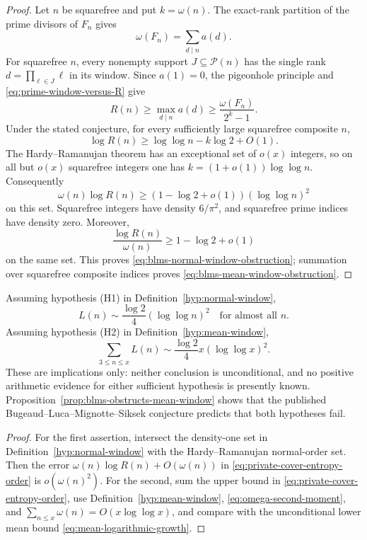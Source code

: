 \begin{proof}
Let $n$ be squarefree and put $k=\omega(n)$. The exact-rank partition of the
prime divisors of $F_n$ gives
\[
 \omega(F_n)=\sum_{d\mid n}a(d).
\]
For squarefree $n$, every nonempty support $J\subseteq\mathcal P(n)$ has the
single rank $d=\prod_{\ell\in J}\ell$ in its window. Since $a(1)=0$, the
pigeonhole principle and \eqref{eq:prime-window-versus-R} give
\begin{equation}\label{eq:squarefree-blms-pigeonhole}
 R(n)\ge\max_{d\mid n}a(d)
 \ge\frac{\omega(F_n)}{2^k-1}.
\end{equation}
Under the stated conjecture, for every sufficiently large squarefree composite
$n$,
\[
 \log R(n)\ge\log\log n-k\log2+O(1).
\]
The Hardy--Ramanujan theorem has an exceptional set of $o(x)$ integers, so on
all but $o(x)$ squarefree integers one has
$k=(1+o(1))\log\log n$. Consequently
\[
 \omega(n)\log R(n)
 \ge(1-\log2+o(1))(\log\log n)^2
\]
on this set. Squarefree integers have density $6/\pi^2$, and squarefree prime
indices have density zero. Moreover,
\[
 \frac{\log R(n)}{\omega(n)}\ge1-\log2+o(1)
\]
on the same set. This proves
\eqref{eq:blms-normal-window-obstruction}; summation over squarefree composite
indices proves \eqref{eq:blms-mean-window-obstruction}.
\end{proof}

\begin{corollary}
\label{cor:conditional-orders}
Assuming hypothesis \textup{(H1)} in Definition~\ref{hyp:normal-window},
\begin{equation}\label{eq:conditional-normal-order}
 L(n)\sim\frac{\log2}{4}(\log\log n)^2
 \quad\text{for almost all }n.
\end{equation}
Assuming hypothesis \textup{(H2)} in Definition~\ref{hyp:mean-window},
\begin{equation}\label{eq:conditional-mean-order}
 \sum_{3\le n\le x}L(n)
 \sim\frac{\log2}{4}x(\log\log x)^2.
\end{equation}
These are implications only: neither conclusion is unconditional, and no
positive arithmetic evidence for either sufficient hypothesis is presently
known. Proposition~\ref{prop:blms-obstructs-mean-window} shows that the
published Bugeaud--Luca--Mignotte--Siksek conjecture predicts that both
hypotheses fail.
\end{corollary}

\begin{proof}
For the first assertion, intersect the density-one set in
Definition~\ref{hyp:normal-window} with the Hardy--Ramanujan normal-order set.
Then the error $\omega(n)\log R(n)+O(\omega(n))$ in
\eqref{eq:private-cover-entropy-order} is $o(\omega(n)^2)$. For the second,
sum the upper bound in \eqref{eq:private-cover-entropy-order}, use
Definition~\ref{hyp:mean-window}, \eqref{eq:omega-second-moment}, and
$\sum_{n\le x}\omega(n)=O(x\log\log x)$, and compare with the unconditional
lower mean bound \eqref{eq:mean-logarithmic-growth}.
\end{proof}

